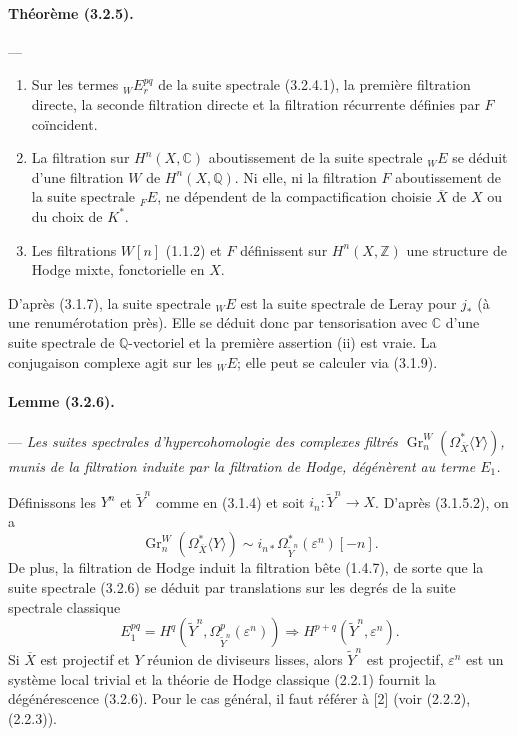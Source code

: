 \documentclass[10pt]{article}
\newcommand{\C}{\mathbb C}
\newcommand{\Q}{\mathbb Q}
\newcommand{\Z}{\mathbb Z}
\newcommand{\Gr}{\operatorname{Gr}}
\begin{document}
\paragraph{Théorème (3.2.5).} --- {\itshape
\begin{enumerate}[label=(\roman*),font=\itshape]
\item Sur les termes ${}_WE_r^{pq}$ de la suite spectrale (3.2.4.1), la première filtration directe, la seconde filtration directe et la filtration récurrente définies par $F$ coïncident.
\item La filtration sur $H^n(X,\C)$ aboutissement de la suite spectrale ${}_WE$ se déduit d'une filtration $W$ de $H^n(X,\Q)$. Ni elle, ni la filtration $F$ aboutissement de la suite spectrale ${}_FE$, ne dépendent de la compactification choisie $\overline X$ de $X$ ou du choix de $K^*$.
\item Les filtrations $W[n]$ (1.1.2) et $F$ définissent sur $H^n(X,\Z)$ une structure de Hodge mixte, fonctorielle en $X$.
\end{enumerate}}

D'après (3.1.7), la suite spectrale ${}_WE$ est la suite spectrale de Leray pour $j_*$ (à une renumérotation près). Elle se déduit donc par tensorisation avec $\C$ d'une suite spectrale de $\Q$-vectoriel et la première assertion (ii) est vraie. La conjugaison complexe agit sur les ${}_WE$; elle peut se calculer via (3.1.9).

\paragraph{Lemme (3.2.6).} --- {\itshape Les suites spectrales d'hypercohomologie des complexes filtrés $\Gr_n^W(\Omega_{\overline X}^{*}\langle Y\rangle)$, munis de la filtration induite par la filtration de Hodge, dégénèrent au terme $E_1$.}

Définissons les $Y^n$ et $\widetilde Y^n$ comme en (3.1.4) et soit $i_n:\widetilde Y^n\to X$. D'après (3.1.5.2), on a
\[
\Gr_n^W(\Omega_{\overline X}^{*}\langle Y\rangle)
\sim i_{n*}\Omega_{\widetilde Y^n}^{*}(\varepsilon^n)[-n].
\]
De plus, la filtration de Hodge induit la filtration bête (1.4.7), de sorte que la suite spectrale (3.2.6) se déduit par translations sur les degrés de la suite spectrale classique
\[
E_1^{pq}=H^q(\widetilde Y^n,\Omega_{\widetilde Y^n}^p(\varepsilon^n))
\Rightarrow H^{p+q}(\widetilde Y^n,\varepsilon^n).
\]
Si $\overline X$ est projectif et $Y$ réunion de diviseurs lisses, alors $\widetilde Y^n$ est projectif, $\varepsilon^n$ est un système local trivial et la théorie de Hodge classique (2.2.1) fournit la dégénérescence (3.2.6). Pour le cas général, il faut référer à [2] (voir (2.2.2), (2.2.3)).
\end{document}

